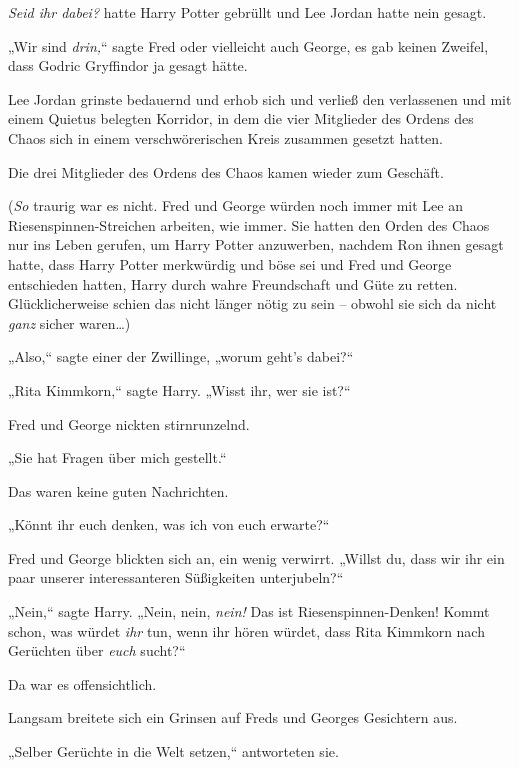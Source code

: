 {\emph{Seid ihr dabei?} hatte Harry Potter gebrüllt und Lee Jordan hatte nein gesagt.

„Wir sind \emph{drin,}“ sagte Fred oder vielleicht auch George, es gab keinen Zweifel, dass Godric Gryffindor ja gesagt hätte.

Lee Jordan grinste bedauernd und erhob sich und verließ den verlassenen und mit einem Quietus belegten Korridor, in dem die vier Mitglieder des Ordens des Chaos sich in einem verschwörerischen Kreis zusammen gesetzt hatten.

Die drei Mitglieder des Ordens des Chaos kamen wieder zum Geschäft.

(\emph{So} traurig war es nicht. Fred und George würden noch immer mit Lee an Riesenspinnen-Streichen arbeiten, wie immer. Sie hatten den Orden des Chaos nur ins Leben gerufen, um Harry Potter anzuwerben, nachdem Ron ihnen gesagt hatte, dass Harry Potter merkwürdig und böse sei und Fred und George entschieden hatten, Harry durch wahre Freundschaft und Güte zu retten. Glücklicherweise schien das nicht länger nötig zu sein -- obwohl sie sich da nicht \emph{ganz} sicher waren…)

„Also,“ sagte einer der Zwillinge, „worum geht's dabei?“

„Rita Kimmkorn,“ sagte Harry. „Wisst ihr, wer sie ist?“

Fred und George nickten stirnrunzelnd.

„Sie hat Fragen über mich gestellt.“

Das waren keine guten Nachrichten.

„Könnt ihr euch denken, was ich von euch erwarte?“

Fred und George blickten sich an, ein wenig verwirrt. „Willst du, dass wir ihr ein paar unserer interessanteren Süßigkeiten unterjubeln?“

„Nein,“ sagte Harry. „Nein, nein, \emph{nein!} Das ist Riesenspinnen-Denken! Kommt schon, was würdet \emph{ihr} tun, wenn ihr hören würdet, dass Rita Kimmkorn nach Gerüchten über \emph{euch} sucht?“

Da war es offensichtlich.

Langsam breitete sich ein Grinsen auf Freds und Georges Gesichtern aus.

„Selber Gerüchte in die Welt setzen,“ antworteten sie.

}
